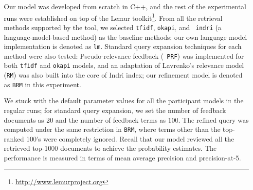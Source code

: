 
Our model was developed from scratch in C++, and the rest of the experimental
runs were established on top of the Lemur
toolkit\footnote{\url{http://www.lemurproject.org}}.  From all the retrieval
methods supported by the tool, we selected {\tt tfidf}, {\tt okapi}, and {\tt
indri} (a language-model-based method) as the baseline methods; our own
language model implementation is denoted as {\tt lm}.  Standard query expansion
techniques for each method were also tested: Pseudo-relevance feedback ({\tt
PRF}) was implemented for both {\tt tfidf} and {\tt okapi} models, and an adaptation of
Lavrenko's relevance model ({\tt RM}) was also built into the core of Indri
index; our refinement model is denoted as {\tt BRM} in this experiment.  

We stuck with the default parameter values {for} all the participant models in
the regular runs; for standard query expansion, we set the number of feedback
documents as 20 and the number of feedback terms as 100.  The refined query was
computed under the same restriction in {\tt BRM}, where terms other than the
top-ranked 100's were completely ignored.  Recall that our model reviewed all
the retrieved top-1000 documents to achieve the probability estimates.  The
performance is measured in terms of mean average precision and precision-at-5.  

